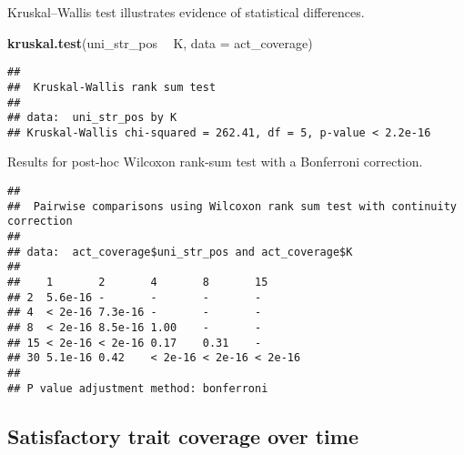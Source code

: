 \documentclass[]{book}
\newenvironment{Shaded}{\begin{snugshade}}{\end{snugshade}}
\newcommand{\DataTypeTok}[1]{\textcolor[rgb]{0.13,0.29,0.53}{#1}}
\newcommand{\KeywordTok}[1]{\textcolor[rgb]{0.13,0.29,0.53}{\textbf{#1}}}
\newcommand{\NormalTok}[1]{#1}
\newcommand{\OperatorTok}[1]{\textcolor[rgb]{0.81,0.36,0.00}{\textbf{#1}}}
\newcommand{\OtherTok}[1]{\textcolor[rgb]{0.56,0.35,0.01}{#1}}
\newcommand{\StringTok}[1]{\textcolor[rgb]{0.31,0.60,0.02}{#1}}
\begin{document}
Kruskal--Wallis test illustrates evidence of statistical differences.

\begin{Shaded}
\begin{Highlighting}[]
\KeywordTok{kruskal.test}\NormalTok{(uni_str_pos }\OperatorTok{~}\StringTok{ }\NormalTok{K, }\DataTypeTok{data =}\NormalTok{ act_coverage)}
\end{Highlighting}
\end{Shaded}

\begin{verbatim}
## 
##  Kruskal-Wallis rank sum test
## 
## data:  uni_str_pos by K
## Kruskal-Wallis chi-squared = 262.41, df = 5, p-value < 2.2e-16
\end{verbatim}

Results for post-hoc Wilcoxon rank-sum test with a Bonferroni correction.

\begin{Shaded}
\end{Shaded}

\begin{verbatim}
## 
##  Pairwise comparisons using Wilcoxon rank sum test with continuity correction 
## 
## data:  act_coverage$uni_str_pos and act_coverage$K 
## 
##    1       2       4       8       15     
## 2  5.6e-16 -       -       -       -      
## 4  < 2e-16 7.3e-16 -       -       -      
## 8  < 2e-16 8.5e-16 1.00    -       -      
## 15 < 2e-16 < 2e-16 0.17    0.31    -      
## 30 5.1e-16 0.42    < 2e-16 < 2e-16 < 2e-16
## 
## P value adjustment method: bonferroni
\end{verbatim}

\hypertarget{satisfactory-trait-coverage-over-time-5}{%
\subsection{Satisfactory trait coverage over time}\label{satisfactory-trait-coverage-over-time-5}}
\end{document}

